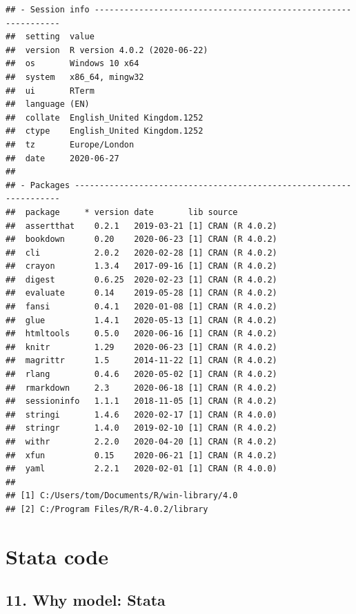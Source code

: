 \documentclass[
  10pt,
]{book}
\begin{document}
\begin{verbatim}
## - Session info ---------------------------------------------------------------
##  setting  value                       
##  version  R version 4.0.2 (2020-06-22)
##  os       Windows 10 x64              
##  system   x86_64, mingw32             
##  ui       RTerm                       
##  language (EN)                        
##  collate  English_United Kingdom.1252 
##  ctype    English_United Kingdom.1252 
##  tz       Europe/London               
##  date     2020-06-27                  
## 
## - Packages -------------------------------------------------------------------
##  package     * version date       lib source        
##  assertthat    0.2.1   2019-03-21 [1] CRAN (R 4.0.2)
##  bookdown      0.20    2020-06-23 [1] CRAN (R 4.0.2)
##  cli           2.0.2   2020-02-28 [1] CRAN (R 4.0.2)
##  crayon        1.3.4   2017-09-16 [1] CRAN (R 4.0.2)
##  digest        0.6.25  2020-02-23 [1] CRAN (R 4.0.2)
##  evaluate      0.14    2019-05-28 [1] CRAN (R 4.0.2)
##  fansi         0.4.1   2020-01-08 [1] CRAN (R 4.0.2)
##  glue          1.4.1   2020-05-13 [1] CRAN (R 4.0.2)
##  htmltools     0.5.0   2020-06-16 [1] CRAN (R 4.0.2)
##  knitr         1.29    2020-06-23 [1] CRAN (R 4.0.2)
##  magrittr      1.5     2014-11-22 [1] CRAN (R 4.0.2)
##  rlang         0.4.6   2020-05-02 [1] CRAN (R 4.0.2)
##  rmarkdown     2.3     2020-06-18 [1] CRAN (R 4.0.2)
##  sessioninfo   1.1.1   2018-11-05 [1] CRAN (R 4.0.2)
##  stringi       1.4.6   2020-02-17 [1] CRAN (R 4.0.0)
##  stringr       1.4.0   2019-02-10 [1] CRAN (R 4.0.2)
##  withr         2.2.0   2020-04-20 [1] CRAN (R 4.0.2)
##  xfun          0.15    2020-06-21 [1] CRAN (R 4.0.2)
##  yaml          2.2.1   2020-02-01 [1] CRAN (R 4.0.0)
## 
## [1] C:/Users/tom/Documents/R/win-library/4.0
## [2] C:/Program Files/R/R-4.0.2/library
\end{verbatim}

\hypertarget{part-stata-code}{%
\part*{Stata code}\label{part-stata-code}}

\hypertarget{why-model-stata}{%
\chapter*{11. Why model: Stata}\label{why-model-stata}}
\end{document}
